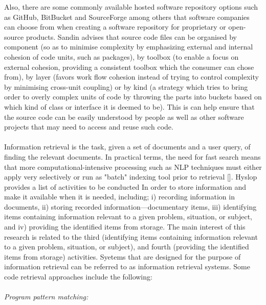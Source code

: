 \documentclass[a4paper]{article}
\begin{document}
Also, there are some commonly available hosted software repository options such as GitHub, BitBucket and SourceForge among others that software companies can choose from when creating a software repository for proprietary or open-source products. Sandin advises that source code files can be organised by component (so as to minimise complexity by emphasizing external and internal cohesion of code units, such as packages), by toolbox (to enable a focus on external cohesion, providing a consistent toolbox which the consumer can chose from), by layer (favors work flow cohesion instead of trying to control complexity by minimising cross-unit coupling) or by kind (a strategy which tries to bring order to overly complex units of code by throwing the parts into buckets based on which kind of class or interface it is deemed to be). This is can help ensure that the source code can be easily understood by people as well as other software projects that may need to access and reuse such code. \\ \\
Information retrieval is the task, given a set of documents and a user query, of finding the relevant documents.  In practical terms, the need for fast search means that more computational-intensive processing such as NLP techniques must either apply very selectively or run as "batch" indexing tool prior to retrieval []. Hyslop provides a list of activities to be conducted In order to store information and make it available when it is needed,  including; i) recording information in documents, ii) storing recorded information—documentary items, iii) identifying items containing information relevant to a given problem, situation, or subject, and iv) providing the identified items from storage. The main interest of this research is related to the third (identifying items containing information relevant to a given problem, situation, or subject), and fourth (providing the identified items from storage) activities. Syetems that are designed for the purpose of information retrieval can be referred to as information retrieval systems. Some code retrieval approaches include the following: \\ \\
\textit{Program pattern matching:} \\
\end{document}
